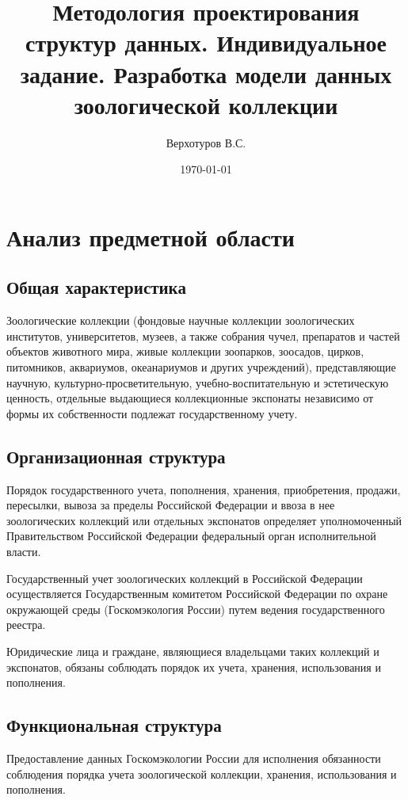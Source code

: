 \documentclass[10pt, a4paper, titlepage]{article}
\title{Методология проектирования структур данных. Индивидуальное задание. Разработка модели данных зоологической коллекции}
\author{Верхотуров В.С.}
\affil{БСБО-05-20}
\affil{РТУ МИРЭА}
\date\today
\begin{document}
\maketitle

\tableofcontents
\newpage

\section{Анализ предметной области}

\subsection{Общая характеристика}

Зоологические коллекции (фондовые научные коллекции зоологических институтов, университетов, музеев, а также собрания чучел, препаратов и частей объектов животного мира, живые коллекции зоопарков, зоосадов, цирков, питомников, аквариумов, океанариумов и других учреждений), представляющие научную, культурно-просветительную, учебно-воспитательную и эстетическую ценность, отдельные выдающиеся коллекционные экспонаты независимо от формы их собственности подлежат государственному учету.

\subsection{Организационная структура}

Порядок государственного учета, пополнения, хранения, приобретения, продажи, пересылки, вывоза за пределы Российской Федерации и ввоза в нее зоологических коллекций или отдельных экспонатов определяет уполномоченный Правительством Российской Федерации федеральный орган исполнительной власти.

Государственный учет зоологических коллекций в Российской Федерации осуществляется Государственным комитетом Российской Федерации по охране окружающей среды (Госкомэкология России) путем ведения государственного реестра.

Юридические лица и граждане, являющиеся владельцами таких коллекций и экспонатов, обязаны соблюдать порядок их учета, хранения, использования и пополнения.

\subsection{Функциональная структура}

Предоставление данных Госкомэкологии России для исполнения обязанности соблюдения порядка учета зоологической коллекции, хранения, использования и пополнения.
\end{document}
